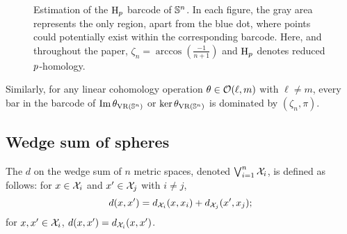 
\begin{figure}[ht]
	\centering
	
	\caption{Estimation of the $\mathrm{H}_p $ barcode of $\mathbb{S}^n$.
		In each figure, the gray area represents the only region, apart from the blue dot, where points could potentially exist within the corresponding barcode.
		Here, and throughout the paper, $\zeta_n = \arccos(\tfrac{-1}{n+1})$ and $\mathrm{H}_p $ denotes reduced $p$-homology. 
        }
	\label{fig:Sk}
\end{figure}

Similarly, for any linear cohomology operation $\theta \in \mathcal{O}(\ell,m)$ with $\ell \neq m$, every bar in the barcode of $\operatorname{Im}\theta_{\operatorname{VR}(\mathbb{S}^n)}$ or $\ker\theta_{\operatorname{VR}(\mathbb{S}^n)}$ is dominated by $(\zeta_n,\pi)$.


\subsection{Wedge sum of spheres}

The  $d$ on the wedge sum of $n$ metric spaces, denoted $\bigvee_{i=1}^n \mathcal{X}_i$, is defined as follows: for $x \in \mathcal{X}_i$ and $x' \in \mathcal{X}_j$ with $i \neq j$,
\[
d(x, x') = d_{\mathcal{X}_i}(x, x_i) + d_{\mathcal{X}_j}(x', x_j);
\]
for $x, x' \in \mathcal{X}_i$, $d(x, x') = d_{\mathcal{X}_i}(x, x')$.

